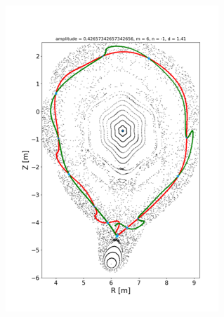 \begin{figure}[H]
    \centering
    \begin{subfigure}{0.49\textwidth}
        \centering
        \includegraphics[width=\textwidth]{images/toytok/toytok-61-0.4.png}
        \caption{}
        \label{fig:scan-wacky-a}
    \end{subfigure}
    \begin{subfigure}{0.49\textwidth}
        \centering

\end{subfigure}
\end{figure}
